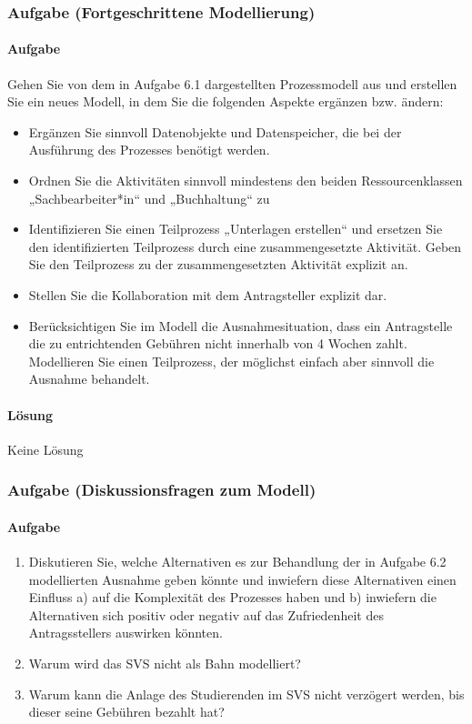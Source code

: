 \subsubsection*{Aufgabe (Fortgeschrittene Modellierung)}
    \paragraph*{Aufgabe}
        Gehen Sie von dem in Aufgabe 6.1 dargestellten Prozessmodell aus und erstellen Sie ein neues Modell, in dem Sie die folgenden Aspekte ergänzen bzw. ändern:

        \begin{itemize}
            \item Ergänzen Sie sinnvoll Datenobjekte und Datenspeicher, die bei der Ausführung des
            Prozesses benötigt werden.
            \item Ordnen Sie die Aktivitäten sinnvoll mindestens den beiden Ressourcenklassen
            „Sachbearbeiter*in“ und „Buchhaltung“ zu
            \item Identifizieren Sie einen Teilprozess „Unterlagen erstellen“ und ersetzen Sie den
            identifizierten Teilprozess durch eine zusammengesetzte Aktivität. Geben Sie den
            Teilprozess zu der zusammengesetzten Aktivität explizit an.
            \item Stellen Sie die Kollaboration mit dem Antragsteller explizit dar.
            \item Berücksichtigen Sie im Modell die Ausnahmesituation, dass ein Antragstelle die zu entrichtenden Gebühren nicht innerhalb von 4 Wochen zahlt. Modellieren Sie einen Teilprozess, der möglichst einfach aber sinnvoll die Ausnahme behandelt.
        \end{itemize}

    \paragraph*{Lösung}
        Keine Lösung

\subsubsection*{Aufgabe (Diskussionsfragen zum Modell)}
    \paragraph*{Aufgabe}
        \begin{enumerate}[label=\alph*)]
            \item Diskutieren Sie, welche Alternativen es zur Behandlung der in Aufgabe 6.2 modellierten Ausnahme geben könnte und inwiefern diese Alternativen einen Einfluss a) auf die Komplexität des Prozesses haben und b) inwiefern die Alternativen sich positiv oder negativ auf das Zufriedenheit des Antragsstellers auswirken könnten.
            \item Warum wird das SVS nicht als Bahn modelliert?
            \item Warum kann die Anlage des Studierenden im SVS nicht verzögert werden, bis dieser seine Gebühren bezahlt hat?
        \end{enumerate}

